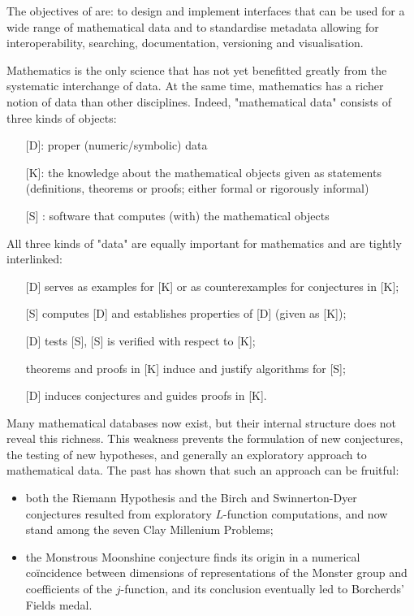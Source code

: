 \addtocounter{wpno}{1}
\begin{Workpackage}{\thewpno}
\WPTitle{\wpname{\thewpno}}



\begin{WPObjectives}
The objectives of \theWP{} are: to design and implement interfaces that can be used for a wide range of mathematical data and to standardise metadata allowing for interoperability, searching, documentation, versioning and visualisation.
\end{WPObjectives}


\begin{WPDescription}
Mathematics is the only science that has not yet benefitted greatly from the systematic interchange of data. At the same time, mathematics has a richer notion of data than other disciplines.
Indeed, "mathematical data" consists of three kinds of objects:
\begin{itemize}
\item[] [D]: proper (numeric/symbolic) data
\item[] [K]:  the knowledge about the mathematical objects given as statements (definitions, theorems or proofs; either formal or rigorously informal)
\item[] [S] : software that computes (with) the mathematical objects
\end{itemize}

All three kinds of "data" are equally important for mathematics and are tightly interlinked:
\begin{itemize}
\item[] [D] serves as examples for [K] or as counterexamples for conjectures in [K];
\item[] [S] computes [D] and establishes properties of [D] (given as [K]);
\item[] [D] tests [S], [S] is verified with respect to [K];
\item[] theorems and proofs in [K] induce and justify algorithms for [S];
\item[] [D] induces conjectures and guides proofs in [K].
\end{itemize}

Many mathematical databases now exist, but their internal structure does not reveal this richness. This weakness prevents the formulation of new conjectures, the testing of new hypotheses, and generally an exploratory approach to mathematical data. The past has shown that such an approach can be fruitful: 
\begin{itemize}
\item both the Riemann Hypothesis and the Birch and Swinnerton-Dyer conjectures resulted from exploratory $L$-function computations, and now stand among the seven Clay Millenium Problems;
\item the Monstrous Moonshine conjecture finds its origin in a numerical co\"incidence between dimensions of representations of the Monster group and coefficients of the $j$-function, and its conclusion eventually led to Borcherds' Fields medal.
\end{itemize}


\end{WPDescription}
\end{Workpackage}
